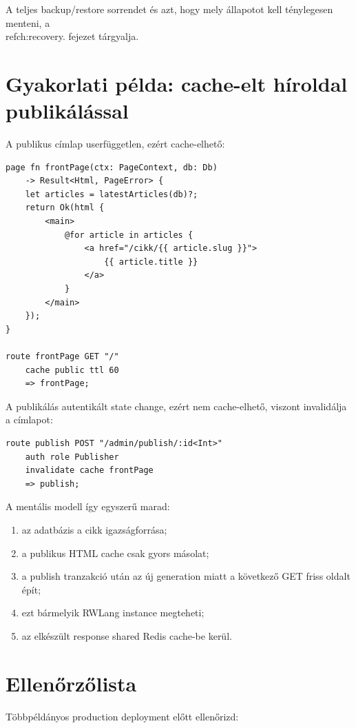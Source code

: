 A teljes backup/restore sorrendet és azt, hogy mely állapotot kell ténylegesen menteni, a \\ref{ch:recovery}. fejezet tárgyalja.

\section{Gyakorlati példa: cache-elt híroldal publikálással}

A publikus címlap userfüggetlen, ezért cache-elhető:

\begin{lstlisting}[language=RWLang]
page fn frontPage(ctx: PageContext, db: Db)
    -> Result<Html, PageError> {
    let articles = latestArticles(db)?;
    return Ok(html {
        <main>
            @for article in articles {
                <a href="/cikk/{{ article.slug }}">
                    {{ article.title }}
                </a>
            }
        </main>
    });
}

route frontPage GET "/"
    cache public ttl 60
    => frontPage;
\end{lstlisting}

A publikálás autentikált state change, ezért nem cache-elhető, viszont invalidálja a címlapot:

\begin{lstlisting}[language=RWLang]
route publish POST "/admin/publish/:id<Int>"
    auth role Publisher
    invalidate cache frontPage
    => publish;
\end{lstlisting}

A mentális modell így egyszerű marad:

\begin{enumerate}
  \item az adatbázis a cikk igazságforrása;
  \item a publikus HTML cache csak gyors másolat;
  \item a publish tranzakció után az új generation miatt a következő GET friss oldalt épít;
  \item ezt bármelyik RWLang instance megteheti;
  \item az elkészült response shared Redis cache-be kerül.
\end{enumerate}

\section{Ellenőrzőlista}

Többpéldányos production deployment előtt ellenőrizd:


